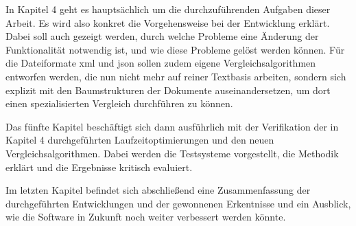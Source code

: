 In Kapitel 4 geht es hauptsächlich um die durchzuführenden Aufgaben dieser Arbeit. Es wird also konkret die Vorgehensweise bei der Entwicklung erklärt. Dabei soll auch gezeigt werden, durch welche Probleme eine Änderung der Funktionalität notwendig ist, und wie diese Probleme gelöst werden können. Für die Dateiformate \acrshort{xml} und \acrshort{json} sollen zudem eigene Vergleichsalgorithmen entworfen werden, die nun nicht mehr auf reiner Textbasis arbeiten, sondern sich explizit mit den Baumstrukturen der Dokumente auseinandersetzen, um dort einen spezialisierten Vergleich durchführen zu können.

Das fünfte Kapitel beschäftigt sich dann ausführlich mit der Verifikation der in Kapitel 4 durchgeführten Laufzeitoptimierungen und den neuen Vergleichsalgorithmen. Dabei werden die Testsysteme vorgestellt, die Methodik erklärt und die Ergebnisse kritisch evaluiert.

Im letzten Kapitel befindet sich abschließend eine Zusammenfassung der durchgeführten Entwicklungen und der gewonnenen Erkentnisse und ein Ausblick, wie die Software in Zukunft noch weiter verbessert werden könnte.